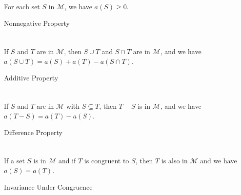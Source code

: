 \documentclass{report}
\begin{document}
For each set $S$ in $\mathscr{M}$, we have $a(S) \geq 0$.

\begin{axiom}

    {Nonnegative Property}

\end{axiom}

\section{}%
\label{sec:area-additive-property}

If $S$ and $T$ are in $\mathscr{M}$, then $S \cup T$ and $S \cap T$ are in
  $\mathscr{M}$, and we have $a(S \cup T) = a(S) + a(T) - a(S \cap T)$.

\begin{axiom}

    {Additive Property}

\end{axiom}

\section{}%
\label{sec:area-difference-property}

If $S$ and $T$ are in $\mathscr{M}$ with $S \subseteq T$, then $T - S$ is in
  $\mathscr{M}$, and we have $a(T - S) = a(T) - a(S)$.

\begin{axiom}

    {Difference Property}

\end{axiom}

\section{}%
\label{sec:area-invariance-under-congruence}

If a set $S$ is in $\mathscr{M}$ and if $T$ is congruent to $S$, then $T$ is
  also in $\mathscr{M}$ and we have $a(S) = a(T)$.

\begin{axiom}

    {Invariance Under Congruence}

\end{axiom}
\end{document}

